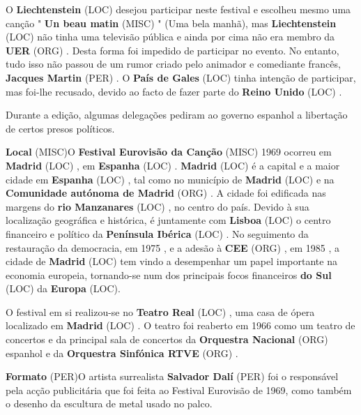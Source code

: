 \documentclass[12pt,a4paper]{article}
\begin{document}
O \textbf{Liechtenstein} (LOC) desejou participar neste festival e escolheu mesmo uma canção " \textbf{Un beau matin} (MISC) " (Uma bela manhã), mas \textbf{Liechtenstein} (LOC) não tinha uma televisão pública e ainda por cima não era membro da \textbf{UER} (ORG) . Desta forma foi impedido de participar no evento. No entanto, tudo isso não passou de um rumor criado pelo animador e comediante francês, \textbf{Jacques Martin} (PER) . O \textbf{País de Gales} (LOC) tinha intenção de participar, mas foi-lhe recusado, devido ao facto de fazer parte do \textbf{Reino Unido} (LOC) .

Durante a edição, algumas delegações pediram ao governo espanhol a libertação de certos presos políticos.



\textbf{Local} (MISC)O \textbf{Festival Eurovisão da Canção} (MISC) 1969 ocorreu em \textbf{Madrid} (LOC) , em \textbf{Espanha} (LOC) . \textbf{Madrid} (LOC) é a capital e a maior cidade em \textbf{Espanha} (LOC) , tal como no município de \textbf{Madrid} (LOC) e na \textbf{Comunidade autónoma de Madrid} (ORG) . A cidade foi edificada nas margens do \textbf{rio Manzanares} (LOC) , no centro do país. Devido à sua localização geográfica e histórica, é juntamente com \textbf{Lisboa} (LOC) o centro financeiro e político da \textbf{Península Ibérica} (LOC) . No seguimento da restauração da democracia, em 1975 , e a adesão à \textbf{CEE} (ORG) , em 1985 , a cidade de \textbf{Madrid} (LOC) tem vindo a desempenhar um papel importante na economia europeia, tornando-se num dos principais focos financeiros \textbf{do Sul} (LOC) da \textbf{Europa} (LOC).

O festival em si realizou-se no \textbf{Teatro Real} (LOC) , uma casa de ópera localizado em \textbf{Madrid} (LOC) . O teatro foi reaberto em 1966 como um teatro de concertos e da principal sala de concertos da \textbf{Orquestra Nacional} (ORG) espanhol e da \textbf{Orquestra Sinfónica RTVE} (ORG) .



\textbf{Formato} (PER)O artista surrealista \textbf{Salvador Dalí} (PER) foi o responsável pela acção publicitária que foi feita ao Festival Eurovisão de 1969, como também o desenho da escultura de metal usado no palco.
\end{document}
